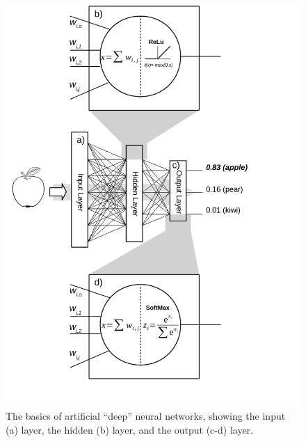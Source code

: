 \documentclass[techrep,english]{ipsj} %
\begin{document}
{\begin{figure}[ht]
  \centering
  \includegraphics[width=\linewidth]{example_ann-crop.pdf}
  \caption{The basics of artificial ``deep'' neural networks, showing the input (a) layer, the hidden (b) layer, and the output (c-d) layer.}\label{fig:ann-example}
\end{figure}

}
\end{document}
